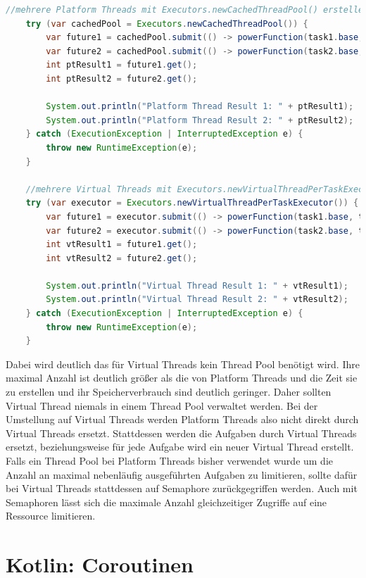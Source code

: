\documentclass[fontsize=12pt,paper=a4,twoside=semi,parskip=half-,headsepline,headinclude]{scrreprt}
\begin{document}
\begin{lstlisting}[language=Java]
	//mehrere Platform Threads mit Executors.newCachedThreadPool() erstellen
	try (var cachedPool = Executors.newCachedThreadPool()) {
		var future1 = cachedPool.submit(() -> powerFunction(task1.base, task1.exponent));
		var future2 = cachedPool.submit(() -> powerFunction(task2.base, task2.exponent));
		int ptResult1 = future1.get();
		int ptResult2 = future2.get();
	
		System.out.println("Platform Thread Result 1: " + ptResult1);
		System.out.println("Platform Thread Result 2: " + ptResult2);
	} catch (ExecutionException | InterruptedException e) {
		throw new RuntimeException(e);
	}

	//mehrere Virtual Threads mit Executors.newVirtualThreadPerTaskExecutor() erstellen
	try (var executor = Executors.newVirtualThreadPerTaskExecutor()) {
		var future1 = executor.submit(() -> powerFunction(task1.base, task1.exponent));
		var future2 = executor.submit(() -> powerFunction(task2.base, task2.exponent));
		int vtResult1 = future1.get();
		int vtResult2 = future2.get();
	
		System.out.println("Virtual Thread Result 1: " + vtResult1);
		System.out.println("Virtual Thread Result 2: " + vtResult2);
	} catch (ExecutionException | InterruptedException e) {
		throw new RuntimeException(e);
	}
\end{lstlisting}

Dabei wird deutlich das für Virtual Threads kein Thread Pool benötigt wird. Ihre maximal Anzahl ist deutlich größer als die von Platform Threads und die Zeit sie zu erstellen und ihr Speicherverbrauch sind deutlich geringer. Daher sollten Virtual Thread niemals in einem Thread Pool verwaltet werden. Bei der Umstellung auf Virtual Threads werden Platform Threads also nicht direkt durch Virtual Threads ersetzt. Stattdessen werden die Aufgaben durch Virtual Threads ersetzt, beziehungsweise für jede Aufgabe wird ein neuer Virtual Thread erstellt. Falls ein Thread Pool bei Platform Threads bisher verwendet wurde um die Anzahl an maximal nebenläufig ausgeführten Aufgaben zu limitieren, sollte dafür bei Virtual Threads stattdessen auf Semaphore zurückgegriffen werden. Auch mit Semaphoren lässt sich die maximale Anzahl gleichzeitiger Zugriffe auf eine Ressource limitieren.

\newpage

\section{Kotlin: Coroutinen}
\end{document}
